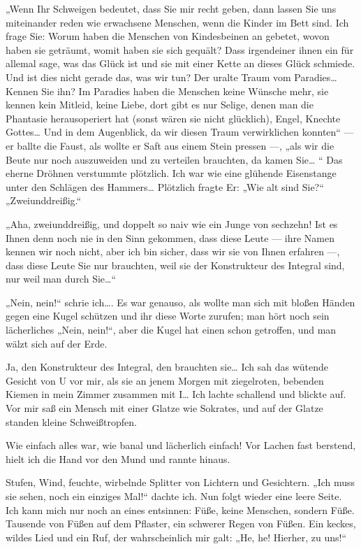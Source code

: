 „Wenn Ihr Schweigen bedeutet, dass Sie mir recht geben, dann lassen
Sie uns miteinander reden wie erwachsene Menschen, wenn die Kinder
im Bett sind. Ich frage Sie: Worum haben die Menschen von
Kindesbeinen an gebetet, wovon haben sie geträumt, womit haben sie
sich gequält? Dass irgendeiner ihnen ein für allemal sage, was das
Glück ist und sie mit einer Kette an dieses Glück schmiede. Und ist
dies nicht gerade das, was wir
tun? Der uralte Traum vom Paradies\ldots{} Kennen Sie ihn? Im Paradies
haben die Menschen keine Wünsche mehr, sie kennen kein Mitleid,
keine Liebe, dort gibt es nur Selige, denen man die Phantasie
herausoperiert hat (sonst wären sie nicht glücklich), Engel,
Knechte Gottes\ldots{} Und in dem Augenblick, da wir diesen Traum
verwirklichen konnten“ — er ballte die Faust, als wollte er Saft
aus einem Stein pressen —, „als wir die Beute nur noch auszuweiden
und zu verteilen brauchten, da kamen Sie\ldots{} “ Das eherne Dröhnen
verstummte plötzlich. Ich war wie eine glühende Eisenstange unter
den Schlägen des Hammers\ldots{} Plötzlich fragte Er: „Wie alt sind
Sie?“ „Zweiunddreißig.“

„Aha, zweiunddreißig, und doppelt so naiv wie ein Junge von
sechzehn! Ist es Ihnen denn noch nie in den Sinn gekommen, dass
diese Leute — ihre Namen kennen wir noch nicht, aber ich bin
sicher, dass wir sie von Ihnen erfahren —, dass diese Leute Sie nur
brauchten, weil sie der Konstrukteur des Integral sind, nur weil
man durch Sie\ldots{}“

„Nein, nein!“ schrie ich\ldots{}. Es war genauso, als wollte man sich
mit bloßen Händen gegen eine Kugel schützen und ihr diese Worte
zurufen; man hört noch sein lächerliches „Nein, nein!“, aber die
Kugel hat einen schon getroffen, und man wälzt sich auf der Erde.

Ja, den Konstrukteur des Integral, den brauchten sie\ldots{} Ich sah das
wütende Gesicht von U vor mir, als sie an jenem Morgen mit
ziegelroten, bebenden Kiemen in mein Zimmer zusammen mit I\ldots{} Ich
lachte schallend und blickte auf. Vor mir saß ein Mensch mit einer
Glatze wie Sokrates, und auf der Glatze standen kleine
Schweißtropfen.

Wie einfach alles war, wie banal und lächerlich einfach! Vor Lachen
fast berstend, hielt ich die Hand vor den Mund und rannte hinaus.

Stufen, Wind, feuchte, wirbelnde Splitter von Lichtern und
Gesichtern. „Ich muss sie sehen, noch ein einziges Mal!“ dachte
ich. Nun folgt wieder eine leere Seite. Ich kann mich nur noch an
eines entsinnen: Füße, keine Menschen, sondern Füße. Tausende von
Füßen auf dem Pflaster, ein schwerer Regen von Füßen. Ein keckes,
wildes Lied und ein Ruf, der wahrscheinlich mir galt: „He, he!
Hierher, zu uns!“

